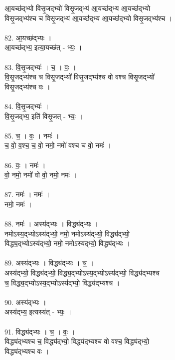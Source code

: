 आ॒यच्छ॑द्भ्यो विसृ॒जद्भ्यो॑ विसृ॒जद्भ्य॑ आ॒यच्छ॑द्भ्य आ॒यच्छ॑द्भ्यो\\
विसृ॒जद्भ्य॑श्च च विसृ॒जद्भ्य॑ आ॒यच्छ॑द्भ्य आ॒यच्छ॑द्भ्यो विसृ॒जद्भ्य॑श्च ।\\
\\
82. आ॒यच्छ॑द्भ्यः ।\\
आ॒यच्छ॑द्भ्य॒ इत्या॒यच्छ॑त् - भ्यः॒ ।\\
\\
83. वि॒सृ॒जद्भ्यः॑ । च॒ । वः॒ ।\\
वि॒सृ॒जद्भ्य॑श्च च विसृ॒जद्भ्यो॑ विसृ॒जद्भ्य॑श्च वो वश्च विसृ॒जद्भ्यो॑\\
विसृ॒जद्भ्य॑श्च वः ।\\
\\
84. वि॒सृ॒जद्भ्यः॑ ।\\
वि॒सृ॒जद्भ्य॒ इति॑ विसृ॒जत् - भ्यः॒ ।\\
\\
85. च॒ । वः॒ । नमः॑ ।\\
च॒ वो॒ व॒श्च॒ च॒ वो॒ नमो॒ नमो॑ वश्च च वो॒ नमः॑ ।\\
\\
86. वः॒ । नमः॑ ।\\
वो॒ नमो॒ नमो॑ वो वो॒ नमो॒ नमः॑ ।\\
\\
87. नमः॑ । नमः॑ ।\\
नमो॒ नमः॑ ।\\
\\
88. नमः॑ । अस्य॑द्भ्यः । विद्ध्य॑द्भ्यः ।\\
नमोऽस्य॒द्भ्योऽस्य॑द्भ्यो॒ नमो॒ नमोऽस्य॑द्भ्यो॒ विद्ध्य॑द्भ्यो॒\\
विद्ध्य॒द्भ्योऽस्य॑द्भ्यो॒ नमो॒ नमोऽस्य॑द्भ्यो॒ विद्ध्य॑द्भ्यः ।\\
\\
89. अस्य॑द्भ्यः । विद्ध्य॑द्भ्यः । च॒ ।\\
अस्य॑द्भ्यो॒ विद्ध्य॑द्भ्यो॒ विद्ध्य॒द्भ्योऽस्य॒द्भ्योऽस्य॑द्भ्यो॒ विद्ध्य॑द्भ्यश्च\\
च॒ विद्ध्य॒द्भ्योऽस्य॒द्भ्योऽस्य॑द्भ्यो॒ विद्ध्य॑द्भ्यश्च ।\\
\\
90. अस्य॑द्भ्यः ।\\
अस्य॑द्भ्य॒ इत्यस्य॑त् - भ्यः॒ ।\\
\\
91. विद्ध्य॑द्भ्यः । च॒ । वः॒ ।\\
विद्ध्य॑द्भ्यश्च च॒ विद्ध्य॑द्भ्यो॒ विद्ध्य॑द्भ्यश्च वो वश्च॒ विद्ध्य॑द्भ्यो॒\\
विद्ध्य॑द्भ्यश्च वः ।\\
\\
